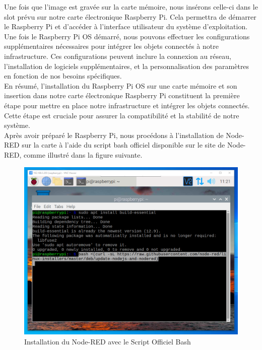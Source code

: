 Une fois que l'image est gravée sur la carte mémoire, nous insérons celle-ci dans le slot prévu sur notre carte électronique Raspberry Pi. Cela permettra de démarrer le Raspberry Pi et d'accéder à l'interface utilisateur du système d'exploitation. \\

Une fois le Raspberry Pi OS démarré, nous pouvons effectuer les configurations supplémentaires nécessaires pour intégrer les objets connectés à notre infrastructure. Ces configurations peuvent inclure la connexion au réseau, l'installation de logiciels supplémentaires, et la personnalisation des paramètres en fonction de nos besoins spécifiques. \\

En résumé, l'installation du Raspberry Pi OS sur une carte mémoire et son insertion dans notre carte électronique Raspberry Pi constituent la première étape pour mettre en place notre infrastructure et intégrer les objets connectés. Cette étape est cruciale pour assurer la compatibilité et la stabilité de notre système. \\



Après avoir préparé le Raspberry Pi, nous procédons à l'installation de Node-RED sur la carte à l'aide du script bash officiel disponible sur le site de Node-RED, comme illustré dans la figure suivante. \\



\begin{figure}[H]
 \centering
    \includegraphics[width=15cm]{Images/NodeRedInstall1.png}
    \caption{Installation du Node-RED avec le Script Officiel Bash}
    \label{Chap4.3.2}
\end{figure}    
\smallskip

